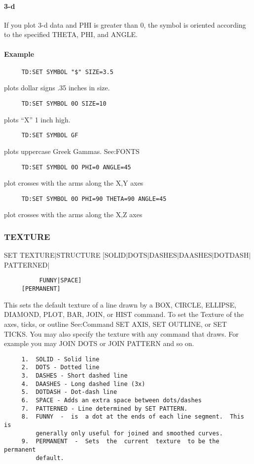 \paragraph{3-d}
If  you  plot  3-d  data  and  PHI  is  greater than 0, the symbol is
oriented according to the specified THETA, PHI, and ANGLE.  
\paragraph{Example}
\begin{verbatim}
     TD:SET SYMBOL "$" SIZE=3.5 
\end{verbatim}
plots dollar signs .35 inches in size.  
\begin{verbatim}
     TD:SET SYMBOL 0O SIZE=10 
\end{verbatim}
plots ``X'' 1 inch high.  
\begin{verbatim}
     TD:SET SYMBOL GF 
\end{verbatim}
plots uppercase Greek Gammas.  See:FONTS 
\begin{verbatim}
     TD:SET SYMBOL 0O PHI=0 ANGLE=45 
\end{verbatim}
plot crosses with the arms along the X,Y axes 
\begin{verbatim}
     TD:SET SYMBOL 0O PHI=90 THETA=90 ANGLE=45 
\end{verbatim}
plot crosses with the arms along the X,Z axes 
\subsubsection{TEXTURE}
SET TEXTURE$|$STRUCTURE [SOLID$|$DOTS$|$DASHES$|$DAASHES$|$DOTDASH$|$PATTERNED$|$
\begin{verbatim}
          FUNNY|SPACE] 
     [PERMANENT] 
\end{verbatim}
This  sets  the  default  texture  of  a  line  drawn by a BOX, CIRCLE,
ELLIPSE, DIAMOND, PLOT, BAR, JOIN, or HIST command.  To set the Texture
of  the  axes,  ticks, or outline See:Command SET AXIS, SET OUTLINE, or
SET TICKS.  You may also specify the  texture  with  any  command  that
draws.  For example you may JOIN DOTS or JOIN PATTERN and so on.  

\begin{verbatim}
     1.  SOLID - Solid line 
     2.  DOTS - Dotted line 
     3.  DASHES - Short dashed line 
     4.  DAASHES - Long dashed line (3x) 
     5.  DOTDASH - Dot-dash line 
     6.  SPACE - Adds an extra space between dots/dashes 
     7.  PATTERNED - Line determined by SET PATTERN.  
     8.  FUNNY  -  is  a dot at the ends of each line segment.  This is
         generally only useful for joined and smoothed curves.  
     9.  PERMANENT  -  Sets  the  current  texture  to be the permanent
         default.  
\end{verbatim}

